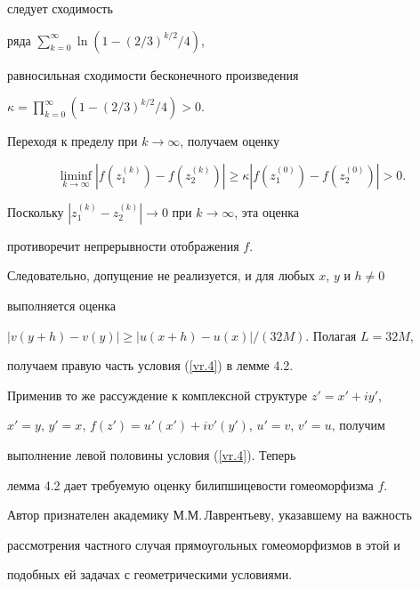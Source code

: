 \begin{pf}
следует сходимость 


ряда $\sum\limits_{k=0}^{\infty} \ln(1-(2/3)^{k/2}/4)$,


равносильная сходимости бесконечного произведения


$\kappa = \prod\limits_{k=0}^{\infty} (1-(2/3)^{k/2}/4) >0$. 


Переходя к пределу при $k\to \infty$, получаем оценку


$$


\liminf_{k\to \infty} |f(z_1^{(k)}) - f(z_2^{(k)})| \geq 


\kappa |f(z_1^{(0)}) - f(z_2^{(0)})| > 0.


$$ 


Поскольку $|z_1^{(k)} - z_2^{(k)}| \to 0$ при $k\to \infty$, эта оценка 


противоречит непрерывности отображения $f$.





Следовательно, допущение не реализуется, и для любых $x$, $y$ и $h\neq0$ 


выполняется оценка 


$|v(y+h) - v(y)| \geq |u(x+h) - u(x)|/(32M)$. Полагая $L = 32M$, 


получаем правую часть условия (\ref{vr.4}) в лемме 4.2. 


Применив то же рассуждение к комплексной структуре $z' = x'+iy'$, 


$x'=y$, $y'=x$, $f(z') = u'(x') + iv'(y')$, $u'=v$, $v'=u$, получим 


выполнение левой половины условия (\ref{vr.4}). Теперь 


лемма 4.2 дает требуемую оценку билипшицевости гомеоморфизма $f$. 


\end{pf}








Автор признателен академику М.М.\,Лаврентьеву, указавшему на важность 


рассмотрения частного случая прямоугольных гомеоморфизмов в этой и 


подобных ей задачах с геометрическими условиями.


 


 


